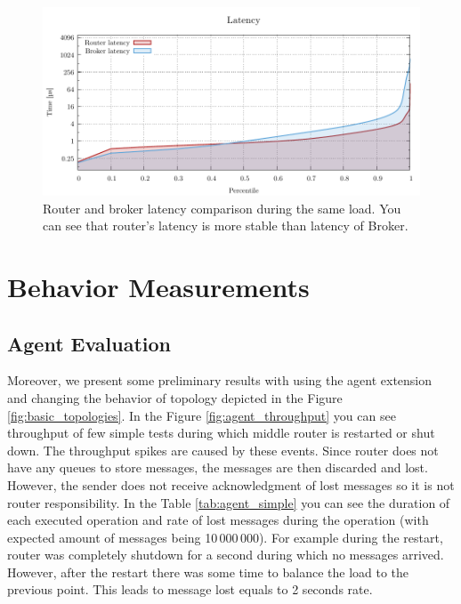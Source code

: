 \begin{figure}[h]
	\centering
	\includegraphics[width=1\linewidth]{obrazky-figures/charts-excel/latency_single.pdf}
	\caption{Router and broker latency comparison during the same load. You can see that router's latency is more stable than latency of Broker.}
	\label{fig:latency_single}
\end{figure}


\section{Behavior Measurements}
\label{Behavior Measurements}


\subsection{Agent Evaluation}
Moreover, we present some preliminary results with using the agent extension and changing the behavior of topology depicted in the Figure \ref{fig:basic_topologies}. In the Figure \ref{fig:agent_throughput} you can see throughput of few simple tests during which middle router is restarted or shut down. The throughput spikes are caused by these events. Since router does not have any queues to store messages, the messages are then discarded and lost. However, the sender does not receive acknowledgment of lost messages so it is not router responsibility. In the Table \ref{tab:agent_simple} you can see the duration of each executed operation and rate of lost messages during the operation (with expected amount of messages being 10\,000\,000). For example during the restart, router was completely shutdown for a second during which no messages arrived. However, after the restart there was some time to balance the load to the previous point. This leads to message lost equals to 2 seconds rate.

